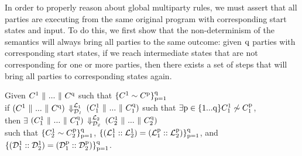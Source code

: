 In order to properly reason about global multiparty rules, we must assert that all parties are executing from the same original program with corresponding start states and input. 
To do this, we first show that the non-determinism of the semantics will always bring all parties to the same outcome: given $\mathrm{{q}}$ parties with corresponding start states, if we reach intermediate states that are not corresponding for one or more parties, then there exists a set of steps that will bring all parties to corresponding states again.


\begin{theorem}[Confluence]
\label{Thm: confluence}
Given ${C^{\mathrm{{1}}}} \-\ \Vert\  ... \-\ \Vert\  {C^{\mathrm{{q}}}}$ such that $\{{C^{\mathrm{{1}}}} \sim {C^{\mathrm{{p}}}}\}^{\mathrm{{q}}}_{\mathrm{{p}} = \mathrm{{1}}}$ 
\\
if $({C^{\mathrm{{1}}}} \-\ \Vert\  ... \-\ \Vert\  {C^{\mathrm{{q}}}})$ $\Downarrow^{{\mathcal{L}_1}}_\mathit{{\mathcal{D}_1}}$ $({C^{\mathrm{{1}}}_1} \-\ \Vert\  ... \-\ \Vert\  {C^{\mathrm{{q}}}_1})$ such that $\exists \mathrm{{p}}\in\{\mathrm{{1}}...\mathrm{{q}}\} {C^{\mathrm{{1}}}_1} \not\sim {C^{\mathrm{{p}}}_1}$, 
\\
then $\exists$ $({C^{\mathrm{{1}}}_1} \-\ \Vert\  ... \-\ \Vert\  {C^{\mathrm{{q}}}_1})$ $\Downarrow^{{\mathcal{L}_2}}_\mathit{{\mathcal{D}_2}}$ $({C^{\mathrm{{1}}}_2} \-\ \Vert\  ... \-\ \Vert\  {C^{\mathrm{{q}}}_2})$
\\ 
such that $\{{C^{\mathrm{{1}}}_2} \sim {C^{\mathrm{{p}}}_2}\}^{\mathrm{{q}}}_{\mathrm{{p}} = \mathrm{{1}}}$, 
$\{({\mathcal{L}^{\mathrm{{1}}}_1}::{\mathcal{L}^{\mathrm{{1}}}_2}) = ({\mathcal{L}^{\mathrm{{p}}}_1}::{\mathcal{L}^{\mathrm{{p}}}_2})\}^{\mathrm{{q}}}_{\mathrm{{p}} = \mathrm{{1}}}$, 
and $\{({\mathcal{D}^{\mathrm{{1}}}_1}::{\mathcal{D}^{\mathrm{{1}}}_2}) = ({\mathcal{D}^{\mathrm{{p}}}_1}::{\mathcal{D}^{\mathrm{{p}}}_2})\}^{\mathrm{{q}}}_{\mathrm{{p}} = \mathrm{{1}}}$.
\end{theorem}


